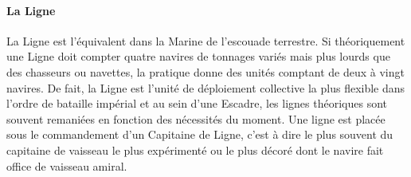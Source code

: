 \documentclass[twoside]{article}
\begin{document}
\paragraph{La Ligne}
La Ligne est l'équivalent dans la Marine de l'escouade terrestre. Si théoriquement une Ligne doit compter quatre navires de tonnages variés mais plus lourds que des chasseurs ou navettes, la pratique donne des unités comptant de deux à vingt navires. De fait, la Ligne est l'unité de déploiement collective la plus flexible dans l'ordre de bataille impérial et au sein d'une Escadre, les lignes théoriques sont souvent remaniées en fonction des nécessités du moment. Une ligne est placée sous le commandement d'un Capitaine de Ligne, c'est à dire le plus souvent du capitaine de vaisseau le plus expérimenté ou le plus décoré dont le navire fait office de vaisseau amiral.
\end{document}
